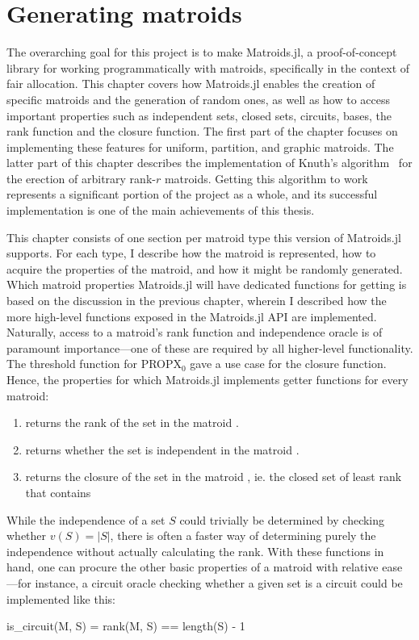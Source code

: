 \chapter{Generating matroids}
\label{chap:generating_matroids}
The overarching goal for this project is to make Matroids.jl, a proof-of-concept library for working programmatically with matroids, specifically in the context of fair allocation. This chapter covers how Matroids.jl enables the creation of specific matroids and the generation of random ones, as well as how to access important properties such as independent sets, closed sets, circuits, bases, the rank function and the closure function. The first part of the chapter focuses on implementing these features for uniform, partition, and graphic matroids. The latter part of this chapter describes the implementation of Knuth's algorithm~\cite{knuth-1975} for the erection of arbitrary rank-$r$ matroids. Getting this algorithm to work represents a significant portion of the project as a whole, and its successful implementation is one of the main achievements of this thesis.

This chapter consists of one section per matroid type this version of Matroids.jl supports. For each type, I describe how the matroid is represented, how to acquire the properties of the matroid, and how it might be randomly generated. Which matroid properties Matroids.jl will have dedicated functions for getting is based on the discussion in the previous chapter, wherein I described how the more high-level functions exposed in the Matroids.jl API are implemented. Naturally, access to a matroid's rank function and independence oracle is of paramount importance---one of these are required by all higher-level functionality. The threshold function for PROPX$_0$ gave a use case for the closure function. Hence, the properties for which Matroids.jl implements getter functions for every matroid: 
\begin{enumerate}
  \item {} returns the rank of the set  in the matroid .
  \item {} returns whether the set  is independent in the matroid .
  \item {} returns the closure of the set  in the matroid , ie. the closed set of least rank that contains 
\end{enumerate}
While the independence of a set $S$ could trivially be determined by checking whether $v(S) = |S|$, there is often a faster way of determining purely the independence without actually calculating the rank. With these functions in hand, one can procure the other basic properties of a matroid with relative ease---for instance, a circuit oracle checking whether a given set is a circuit could be implemented like this:
\begin{jllisting}
is_circuit(M, S) = rank(M, S) == length(S) - 1
\end{jllisting}


